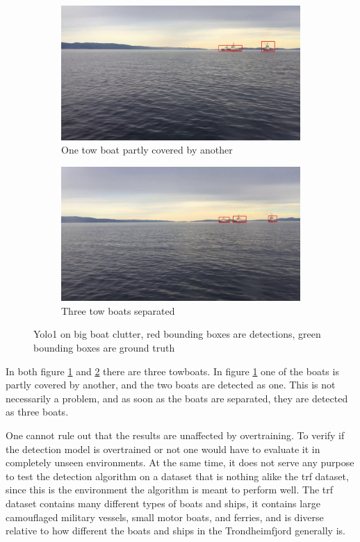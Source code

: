 \begin{figure}[h!]
\begin{subfigure}{.5\textwidth}
  \centering
  \includegraphics[width=0.8\linewidth]{results/video/video3/frame479.jpg}
  \caption{One tow boat partly covered by another}
  \label{fig:yolo1_clut_tow}
\end{subfigure}%
\begin{subfigure}{.5\textwidth}
  \centering
  \includegraphics[width=.8\linewidth]{results/video/video3/frame677.jpg}
  \caption{Three tow boats separated}
  \label{fig:yolo1_sep}
\end{subfigure}
\caption{Yolo1 on big boat clutter, red bounding boxes are detections, green bounding boxes are ground truth}
\label{fig:yolo1_clutter}
\end{figure}

In both figure \ref{fig:yolo1_clut_tow} and \ref{fig:yolo1_sep} there are three towboats. In figure \ref{fig:yolo1_clut_tow} one of the boats is partly covered by another, and the two boats are detected as one. This is not necessarily a problem, and as soon as the boats are separated, they are detected as three boats. 

\vspace{3mm}

One cannot rule out that the results are unaffected by overtraining. To verify if the detection model is overtrained or not one would have to evaluate it in completely unseen environments. At the same time, it does not serve any purpose to test the detection algorithm on a dataset that is nothing alike the trf dataset, since this is the environment the algorithm is meant to perform well. The trf dataset contains many different types of boats and ships, it contains large camouflaged military vessels, small motor boats, and ferries, and is diverse relative to how different the boats and ships in the Trondheimfjord generally is. 

